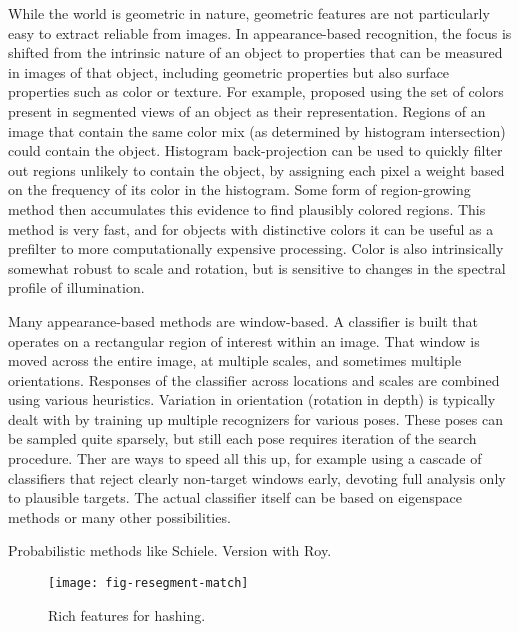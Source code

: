 While the world is geometric in nature, geometric features are  not
particularly easy to extract reliable from images.  In
appearance-based recognition, the focus is shifted from the 
intrinsic nature of an object to properties that can be measured
in images of that object, including geometric properties but
also surface properties such as color or texture.
%
For example, \cite{swain91color} proposed using the set of colors
present in segmented views of an object as their representation.
Regions of an image that contain the same color mix (as determined
by histogram intersection) could contain the object.
%
Histogram back-projection can be used to quickly filter out regions
unlikely to contain the object, by assigning each pixel a weight based
on the frequency of its color in the histogram.  Some form of
region-growing method then accumulates this evidence to find plausibly
colored regions.  This method is very fast, and for objects with
distinctive colors it can be useful as a prefilter to more
computationally expensive processing.
%
Color is also intrinsically somewhat robust to scale and rotation,
but is sensitive to changes in the spectral profile of illumination.

Many appearance-based methods are window-based.  A classifier is built
that operates on a rectangular region of interest within an image.
That window is moved across the entire image, at multiple scales, and
sometimes multiple orientations.  Responses of the classifier across
locations and scales are combined using various heuristics.  Variation
in orientation (rotation in depth) is typically dealt with by training
up multiple recognizers for various poses.  These poses can be sampled
quite sparsely, but still each pose requires iteration of the search
procedure.  Ther are ways to speed all this up, for example using a
cascade of classifiers that reject clearly non-target windows early,
devoting full analysis only to plausible targets.
%
The actual classifier itself can be based on eigenspace methods
or many other possibilities.

Probabilistic methods like Schiele.  Version with Roy.



\begin{figure}[tb]
\centerline{\texttt{[image: fig-resegment-match]}}
\caption[Hashing with rich features]{ 
%
%
Rich features for hashing.
%
}
\label{fig:rich-hashing}
\end{figure}

